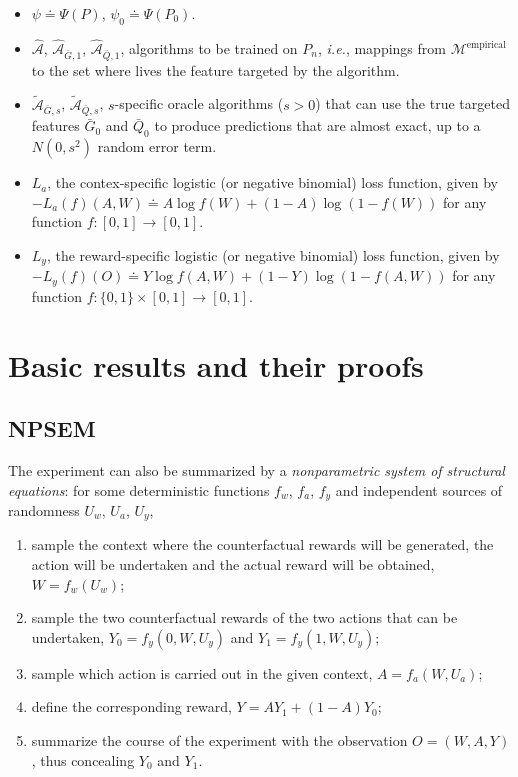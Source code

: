 \documentclass[11pt,openright,twoside]{book}
\newcommand{\Algo}{\widehat{\mathcal{A}}}
\newcommand{\Algora}{\widetilde{\mathcal{A}}}
\newcommand{\defq}{\doteq}
\newcommand{\calM}{\mathcal{M}}
\newcommand{\Gbar}{\bar{G}}
\newcommand{\Qbar}{\bar{Q}}
\theoremstyle{definition}
\theoremstyle{definition}
\theoremstyle{definition}
\theoremstyle{remark}
\begin{document}
\begin{itemize}
\item
  \(\psi \defq \Psi(P)\), \(\psi_{0} \defq \Psi(P_{0})\).
\item
  \(\Algo\), \(\Algo_{\Gbar,1}\), \(\Algo_{\Qbar,1}\), algorithms to be trained on
  \(P_{n}\), \emph{i.e.}, mappings from \(\calM^{\text{empirical}}\) to the set where
  lives the feature targeted by the algorithm.
\item
  \(\Algora_{\Gbar,s}\), \(\Algora_{\Qbar,s}\), \(s\)-specific oracle algorithms
  (\(s>0\)) that can use the true targeted features \(\Gbar_{0}\) and \(\Qbar_{0}\)
  to produce predictions that are almost exact, up to a \(N(0,s^{2})\) random
  error term.
\item
  \(L_{a}\), the contex-specific logistic (or negative binomial) loss function,
  given by \(-L_{a}(f)(A,W) \defq A \log f(W) + (1-A) \log (1-f(W))\) for
  any function \(f:[0,1]\to[0,1]\).
\item
  \(L_{y}\), the reward-specific logistic (or negative binomial) loss function,
  given by \(-L_{y}(f)(O) \defq Y \log f(A,W) + (1-Y) \log (1-f(A,W))\) for
  any function \(f:\{0,1\} \times [0,1] \to[0,1]\).
\end{itemize}

\hypertarget{proofs}{%
\chapter{Basic results and their proofs}\label{proofs}}

\hypertarget{npsem}{%
\section{NPSEM}\label{npsem}}

The experiment can also be summarized by a \emph{nonparametric system of structural
equations}: for some deterministic functions \(f_w\), \(f_a\), \(f_y\) and
independent sources of randomness \(U_w\), \(U_a\), \(U_y\),

\begin{enumerate}
\def\labelenumi{\arabic{enumi}.}
\item
  sample the context where the counterfactual rewards will be generated, the
  action will be undertaken and the actual reward will be obtained, \(W = f_{w}(U_w)\);
\item
  sample the two counterfactual rewards of the two actions that can be
  undertaken, \(Y_{0} = f_{y}(0, W, U_y)\) and \(Y_{1} = f_{y}(1, W, U_y)\);
\item
  sample which action is carried out in the given context, \(A = f_{a} (W, U_a)\);
\item
  define the corresponding reward, \(Y = A Y_{1} + (1-A) Y_{0}\);
\item
  summarize the course of the experiment with the observation \(O = (W, A, Y)\), thus concealing \(Y_{0}\) and \(Y_{1}\).
\end{enumerate}
\end{document}
